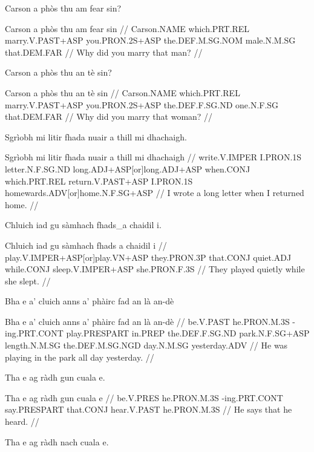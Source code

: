 \documentclass[a4paper,10pt]{article}
\begin{document}
\ex
\begingl
\glpre Carson a phòs thu am fear sin? 

\vspace{4mm}
\gla Carson a phòs thu am fear sin  //
\glb Carson.NAME which.PRT.REL marry.V.PAST+ASP you.PRON.2S+ASP the.DEF.M.SG.NOM male.N.M.SG that.DEM.FAR  //
\glft Why did you marry that man? //
\endgl
\xe

\ex
\begingl
\glpre Carson a phòs thu an tè sin? 

\vspace{4mm}
\gla Carson a phòs thu an tè sin  //
\glb Carson.NAME which.PRT.REL marry.V.PAST+ASP you.PRON.2S+ASP the.DEF.F.SG.ND one.N.F.SG that.DEM.FAR  //
\glft Why did you marry that woman? //
\endgl
\xe

\ex
\begingl
\glpre Sgrìobh mi litir fhada nuair a thill mi dhachaigh. 

\vspace{4mm}
\gla Sgrìobh mi litir fhada nuair a thill mi dhachaigh  //
\glb write.V.IMPER I.PRON.1S letter.N.F.SG.ND long.ADJ+ASP[or]long.ADJ+ASP when.CONJ which.PRT.REL return.V.PAST+ASP I.PRON.1S homewards.ADV[or]home.N.F.SG+ASP  //
\glft I wrote a long letter when I returned home. //
\endgl
\xe

\ex
\begingl
\glpre Chluich iad gu sàmhach fhads\_a chaidil i. 

\vspace{4mm}
\gla Chluich iad gu sàmhach {fhads a} chaidil i  //
\glb play.V.IMPER+ASP[or]play.VN+ASP they.PRON.3P that.CONJ quiet.ADJ while.CONJ sleep.V.IMPER+ASP she.PRON.F.3S  //
\glft They played quietly while she slept. //
\endgl
\xe

\ex
\begingl
\glpre Bha e a' cluich anns a' phàirc fad an là an-dè 

\vspace{4mm}
\gla Bha e a' cluich anns a' phàirc fad an là an-dè  //
\glb be.V.PAST he.PRON.M.3S -ing.PRT.CONT play.PRESPART in.PREP the.DEF.F.SG.ND park.N.F.SG+ASP length.N.M.SG the.DEF.M.SG.NGD day.N.M.SG yesterday.ADV  //
\glft He was playing in the park all day yesterday. //
\endgl
\xe

\ex
\begingl
\glpre Tha e ag ràdh gun cuala e. 

\vspace{4mm}
\gla Tha e ag ràdh gun cuala e  //
\glb be.V.PRES he.PRON.M.3S -ing.PRT.CONT say.PRESPART that.CONJ hear.V.PAST he.PRON.M.3S  //
\glft He says that he heard. //
\endgl
\xe

\ex
\begingl
\glpre Tha e ag ràdh nach cuala e. 
\end{document}
